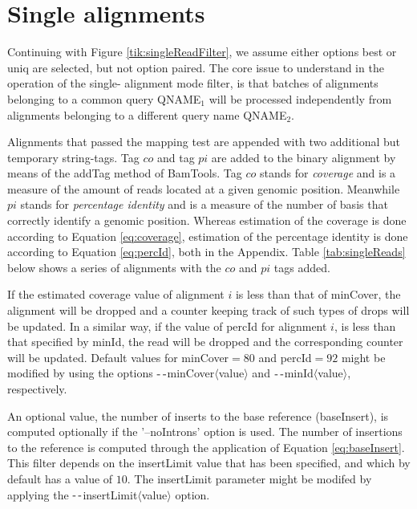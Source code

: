 \documentclass[11pt]{article}
\newcommand{\subscript}[1]{\ensuremath{_{\textrm{#1}}}}
\newcommand{\printOption}[1]{$\textrm{-\,-}${\fontfamily{phv}\selectfont#1}$\langle${\fontfamily{phv}\selectfont value}$\rangle$}
\newcommand{\setOption}[2]{{\fontfamily{phv}\selectfont#1}\ensuremath{=#2}}
\newcommand{\option}[1]{{\fontfamily{phv}\selectfont#1}}
\newcommand{\bamApi}[1]{#1}
\begin{document}
{\section{Single alignments} \label{sec:singleAls}
Continuing with Figure \ref{tik:singleReadFilter}, we assume either options \option{best} or \option{uniq}  
are selected, but not option \option{paired}. The core issue to understand in the operation of the single-
alignment mode filter, is that batches of alignments belonging to a common query QNAME\subscript{1} will 
be processed independently from alignments belonging to a different query name QNAME\subscript{2}. 

Alignments that passed the mapping test are appended with two additional but temporary 
string-tags. Tag $co$ and tag $pi$ are added to the binary alignment by means of the \bamApi{addTag} method of 
BamTools. Tag $co$ stands for \emph{coverage} and is a measure of the amount of reads located at a given 
genomic position. Meanwhile $pi$ stands for \emph{percentage identity} and is a measure of the number of 
basis that correctly identify a genomic position. Whereas estimation of the coverage is done according to 
Equation \ref{eq:coverage}, estimation of the percentage identity is done according to Equation \ref{eq:percId}, both in the Appendix. Table \ref{tab:singleReads} below shows a series of alignments with the $co$ and 
$pi$ tags added.

 
If the estimated coverage value of alignment $i$ is less than that of \option{minCover}, the alignment 
will be dropped and a counter keeping track of such types of drops will be updated. In a similar way, if 
the value of \option{percId} for alignment $i$, is less than that specified by \option{minId}, the read 
will be dropped and the corresponding counter will be updated. Default values for \setOption{minCover}{80} 
and \setOption{percId}{92} might be modified by using the options \printOption{minCover} and 
\printOption{minId}, respectively.

An optional value, the number of inserts to the base reference (baseInsert), is computed optionally if 
the '--noIntrons' option is used. The number of insertions to the reference is computed through the 
application of Equation \ref{eq:baseInsert}. This filter depends on the insertLimit value that has been 
specified, and which by default has a value of $10$. The insertLimit parameter might be modifed by 
applying the \printOption{insertLimit} option.

}
\end{document}
